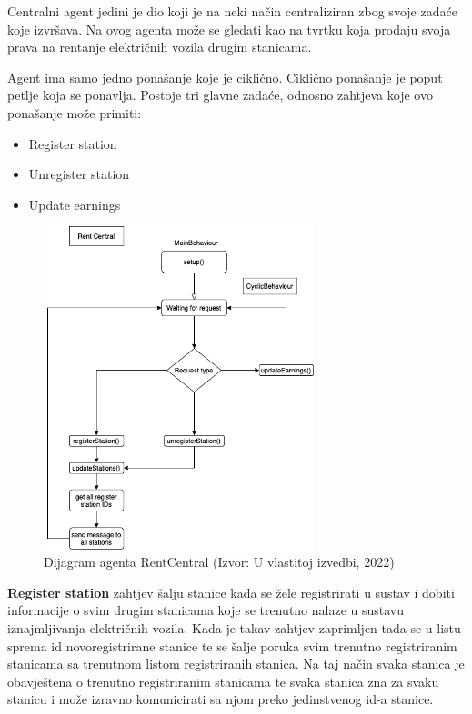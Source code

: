 \documentclass{foi}
\begin{document}
Centralni agent jedini je dio koji je na neki način centraliziran zbog svoje zadaće koje izvršava. Na ovog agenta može se gledati kao na tvrtku koja prodaju svoja prava na rentanje električnih vozila drugim stanicama. 

Agent ima samo jedno ponašanje koje je ciklično. Ciklično ponašanje je poput petlje koja se ponavlja. Postoje tri glavne zadaće, odnosno zahtjeva koje ovo ponašanje može primiti:
\begin{itemize}
	\item Register station
	\item Unregister station
	\item Update earnings
\end{itemize}

\begin{figure}[h!]
	\centering
	\includegraphics[width=0.7\textwidth]{slike/rentCentralSheme.png}
	\caption{Dijagram agenta RentCentral (Izvor: U vlastitoj izvedbi, 2022)}
\end{figure}

\textbf{Register station} zahtjev šalju stanice kada se žele registrirati u sustav i dobiti informacije o svim drugim stanicama koje se trenutno nalaze u sustavu iznajmljivanja električnih vozila. Kada je takav zahtjev zaprimljen tada se u listu sprema id novoregistrirane stanice te se šalje poruka svim trenutno registriranim stanicama sa trenutnom listom registriranih stanica. Na taj način svaka stanica je obavještena o trenutno registriranim stanicama te svaka stanica zna za svaku stanicu i može izravno komunicirati sa njom preko jedinstvenog id-a stanice.
\end{document}
